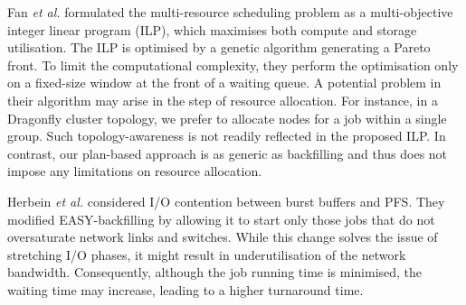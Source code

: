 \documentclass[runningheads]{llncs}
\begin{document}
Fan \textit{et al.} \cite{10.1145/3307681.3325401} formulated the multi-resource scheduling problem as a multi-objective integer linear program (ILP), which maximises both compute and storage utilisation. The ILP is optimised by a genetic algorithm generating a Pareto front. To limit the computational complexity, they perform the optimisation only on a fixed-size window at the front of a waiting queue.
A potential problem in their algorithm may arise in the step of resource allocation. %
For instance, in a Dragonfly cluster topology, we prefer to allocate nodes for a job within a single group. Such topology-awareness is not readily reflected in the proposed ILP. In contrast, our plan-based approach is as generic as backfilling and thus does not impose any limitations on resource allocation.

Herbein \textit{et al.} \cite{10.1145/2907294.2907316} considered I/O contention between burst buffers and PFS. They modified EASY-backfilling by allowing it to start only those jobs that do not oversaturate network links and switches. While this change solves the issue of stretching I/O phases, it might result in underutilisation of the network bandwidth. Consequently, although the job running time is minimised, the waiting time may increase, leading to a higher turnaround time. 
\end{document}

